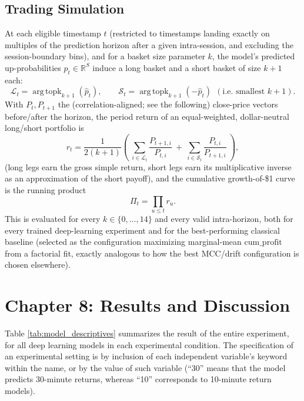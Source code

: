 \documentclass[stu,floatsintext]{apa7}
\newcommand{\R}{\mathbb{R}}
\DeclareMathOperator*{\argtopk}{arg\,topk}
\begin{document}
\subsection{Trading Simulation}

At each eligible timestamp $t$ (restricted to timestamps landing exactly on multiples of the prediction
horizon after a given intra-session, and excluding the session-boundary bins), and for a
basket size parameter $k$, the model's predicted up-probabilities $\hat p_t\in\R^{S}$ induce a long basket
and a short basket of size $k+1$ each:
\begin{equation}
  \mathcal L_t = \argtopk_{k+1}(\hat p_t), \qquad \mathcal S_t = \argtopk_{k+1}(-\hat p_t)\ \ (\text{i.e.\ smallest } k{+}1).
\end{equation}
With $P_t, P_{t+1}$ the (correlation-aligned; see the following) close-price vectors before/after the horizon, the
period return of an equal-weighted, dollar-neutral long/short portfolio is
\begin{equation}
  r_t = \frac{1}{2(k+1)}\left(\ \sum_{i\in\mathcal L_t} \frac{P_{t+1,i}}{P_{t,i}}
  \ +\ \sum_{i\in\mathcal S_t} \frac{P_{t,i}}{P_{t+1,i}}\ \right),
\end{equation}
(long legs earn the gross simple return, short legs earn its multiplicative inverse as an approximation of
the short payoff), and the cumulative growth-of-\$1 curve is the running product
\begin{equation}
  \Pi_t = \prod_{u\le t} r_u.
\end{equation}
This is evaluated for every $k\in\{0,\dots,14\}$ and every valid intra-horizon, both for
every trained deep-learning experiment and for the best-performing classical baseline (selected as the
configuration maximizing marginal-mean $\mathrm{cum\_profit}$ from a factorial fit, exactly analogous to how the best MCC/drift configuration is chosen elsewhere).

\clearpage
\section{Chapter 8: Results and Discussion}

Table \ref{tab:model_descriptives} summarizes the result of the entire experiment, for all deep learning models in each experimental condition. The specification of an experimental setting is by inclusion of each independent variable's keyword within the name, or by the value of such variable (``30'' means that the model predicts 30-minute returns, whereas ``10'' corresponds to 10-minute return models).
\medskip
\medskip
\end{document}
